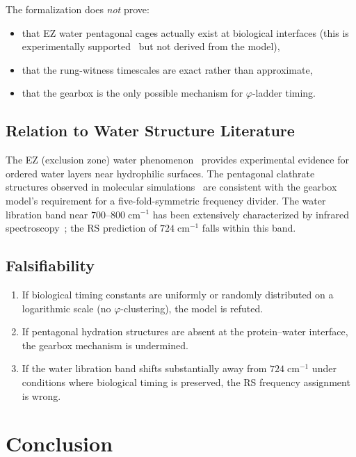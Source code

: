 \documentclass[11pt,twocolumn]{article}
\begin{document}
The formalization does \emph{not} prove:
\begin{itemize}
\item that EZ water pentagonal cages actually exist at biological
  interfaces (this is experimentally supported~\cite{Pollack2013} but not
  derived from the model),
\item that the rung-witness timescales are exact rather than approximate,
\item that the gearbox is the only possible mechanism for $\varphi$-ladder
  timing.
\end{itemize}

\subsection{Relation to Water Structure Literature}

The EZ (exclusion zone) water phenomenon~\cite{Pollack2013} provides
experimental evidence for ordered water layers near hydrophilic surfaces.
The pentagonal clathrate structures observed in molecular
simulations~\cite{Laage2006} are consistent with the gearbox model's
requirement for a five-fold-symmetric frequency divider. The water
libration band near $700$--$800\;\mathrm{cm}^{-1}$ has been extensively
characterized by infrared spectroscopy~\cite{Walrafen1972}; the RS
prediction of $724\;\mathrm{cm}^{-1}$ falls within this band.

\subsection{Falsifiability}

\begin{enumerate}
\item If biological timing constants are uniformly or randomly distributed
  on a logarithmic scale (no $\varphi$-clustering), the model is refuted.
\item If pentagonal hydration structures are absent at the protein--water
  interface, the gearbox mechanism is undermined.
\item If the water libration band shifts substantially away from
  $724\;\mathrm{cm}^{-1}$ under conditions where biological timing is
  preserved, the RS frequency assignment is wrong.
\end{enumerate}

\section{Conclusion}
\end{document}
